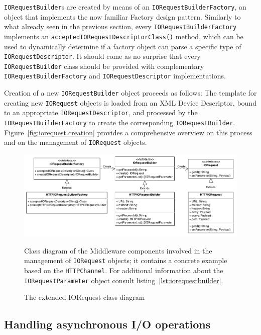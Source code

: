\texttt{IORequestBuilder}s are created by means of an \texttt{IORequestBuilderFactory}, an object that implements the now familiar Factory design pattern. Similarly to what already seen in the previous section, every \texttt{IORequestBuilderFactory} implements an \texttt{acceptedIORequestDescriptorClass()} method, which can be used to dynamically determine if a factory object can parse a specific type of \texttt{IORequestDescriptor}.   It should come as no surprise that every \texttt{IORequestBuilder} class should be provided with complementary \texttt{IORequestBuilderFactory} and \texttt{IORequestDescriptor} implementations.

Creation of a new \texttt{IORequestBuilder} object proceeds as follows: The template for creating new \texttt{IORequest} objects is loaded from an XML Device Descriptor, bound to an appropriate \texttt{IORequestDescriptor}, and processed by the \texttt{IORequestBuilderFactory} to create the corresponding \texttt{IORequestBuilder}. Figure~\ref{fig:iorequest.creation} provides a comprehensive overview on this process and on the management of \texttt{IORequest} objects.

\begin{figure}[!hbt]
\includegraphics[width=\textwidth]{imgs/iorequest.pdf}
\caption{The extended IORequest class diagram}
\label{fig:iorequest.class}
{
\begin{figurenote}
Class diagram of the Middleware components involved in the management of \texttt{IORequest} objects; it contains a concrete example based on the \texttt{HTTPChannel}. For additional information about the \texttt{IORequestParameter} object consult listing~\ref{lst:iorequestbuilder}.
\end{figurenote}
}
\end{figure}


\subsection{Handling asynchronous I/O operations}

